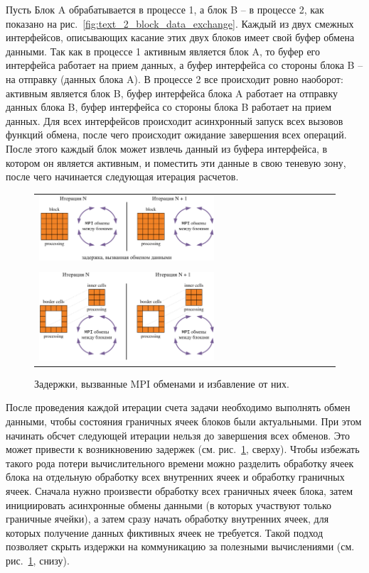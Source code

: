 Пусть Блок A обрабатывается в процессе 1, а блок B -- в процессе 2, как показано на рис.~\ref{fig:text_2_block_data_exchange}.
Каждый из двух смежных интерфейсов, описывающих касание этих двух блоков имеет свой буфер обмена данными.
Так как в процессе 1 активным является блок A, то буфер его интерфейса работает на прием данных, а буфер интерфейса со стороны блока B -- на отправку (данных блока A).
В процессе 2 все происходит ровно наоборот: активным является блок B, буфер интерфейса блока A работает на отправку данных блока B, буфер интерфейса со стороны блока B работает на прием данных.
Для всех интерфейсов происходит асинхронный запуск всех вызовов функций обмена, после чего происходит ожидание завершения всех операций.
После этого каждый блок может извлечь данный из буфера интерфейса, в котором он является активным, и поместить эти данные в свою теневую зону, после чего начинается следующая итерация расчетов.

\begin{figure}[ht]
\centering
\begin{tabular}{l}
\includegraphics[width=0.6\textwidth]{./pics/text_2_block/11-mpi1.png}
\\
\\
\includegraphics[width=0.6\textwidth]{./pics/text_2_block/12-mpi2.png}
\end{tabular}
\singlespacing
{}\caption{Задержки, вызванные MPI обменами и избавление от них.}
\label{fig:text_2_block_mpi1}
\end{figure}

После проведения каждой итерации счета задачи необходимо выполнять обмен данными, чтобы состояния граничных ячеек блоков были актуальными.
При этом начинать обсчет следующей итерации нельзя до завершения всех обменов.
Это может привести к возникновению задержек (см. рис.~\ref{fig:text_2_block_mpi1}, сверху).
Чтобы избежать такого рода потери вычислительного времени можно разделить обработку ячеек блока на отдельную обработку всех внутренних ячеек и обработку граничных ячеек.
Сначала нужно произвести обработку всех граничных ячеек блока, затем инициировать асинхронные обмены данными (в которых участвуют только граничные ячейки), а затем сразу начать обработку внутренних ячеек, для которых получение данных фиктивных ячеек не требуется.
Такой подход позволяет скрыть издержки на коммуникацию за полезными вычислениями (см. рис.~\ref{fig:text_2_block_mpi1}, снизу).

